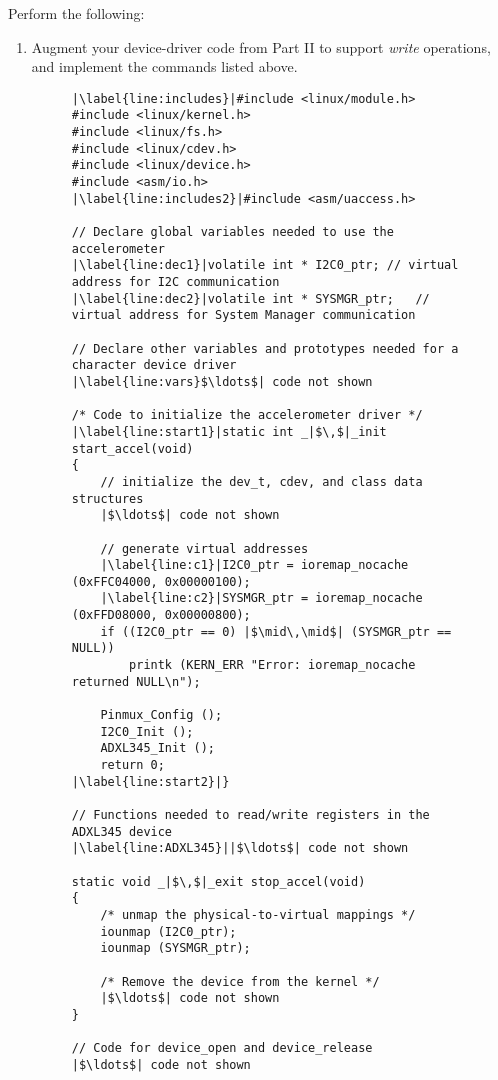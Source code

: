 \documentclass[epsfig,10pt,fullpage]{article}
\begin{document}
\noindent
Perform the following:

\begin{enumerate}
\item Augment your device-driver code from Part II to support {\it write} operations, 
and implement the commands listed above. 
\newpage
\lstset{language=C,numbers=left,escapechar=|}
\begin{figure}[h]
\begin{center}
\begin{minipage}[t]{15 cm}
\begin{lstlisting}[name=dots]
|\label{line:includes}|#include <linux/module.h>
#include <linux/kernel.h>
#include <linux/fs.h>
#include <linux/cdev.h>
#include <linux/device.h>
#include <asm/io.h>
|\label{line:includes2}|#include <asm/uaccess.h>

// Declare global variables needed to use the accelerometer
|\label{line:dec1}|volatile int * I2C0_ptr;	// virtual address for I2C communication
|\label{line:dec2}|volatile int * SYSMGR_ptr;	// virtual address for System Manager communication

// Declare other variables and prototypes needed for a character device driver
|\label{line:vars}$\ldots$| code not shown

/* Code to initialize the accelerometer driver */
|\label{line:start1}|static int _|$\,$|_init start_accel(void)
{
	// initialize the dev_t, cdev, and class data structures
	|$\ldots$| code not shown

	// generate virtual addresses
	|\label{line:c1}|I2C0_ptr = ioremap_nocache (0xFFC04000, 0x00000100);
	|\label{line:c2}|SYSMGR_ptr = ioremap_nocache (0xFFD08000, 0x00000800);
	if ((I2C0_ptr == 0) |$\mid\,\mid$| (SYSMGR_ptr == NULL))
		printk (KERN_ERR "Error: ioremap_nocache returned NULL\n");

	Pinmux_Config ();
	I2C0_Init ();
	ADXL345_Init ();
	return 0;
|\label{line:start2}|}

// Functions needed to read/write registers in the ADXL345 device
|\label{line:ADXL345}||$\ldots$| code not shown

static void _|$\,$|_exit stop_accel(void)
{
	/* unmap the physical-to-virtual mappings */
	iounmap (I2C0_ptr);
	iounmap (SYSMGR_ptr);

	/* Remove the device from the kernel */
	|$\ldots$| code not shown
}

// Code for device_open and device_release
|$\ldots$| code not shown


\end{lstlisting}
\end{minipage}
\end{center}
\end{figure}
\end{enumerate}
\end{document}
